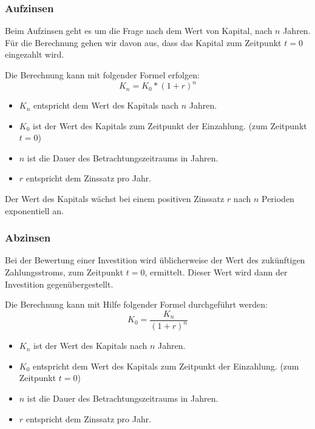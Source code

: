 \documentclass[a4paper,12pt]{article}
\begin{document}
	\subsubsection{Aufzinsen}
	Beim Aufzinsen geht es um die Frage nach dem Wert von Kapital, nach $n$ Jahren. Für die Berechnung gehen wir davon aus, dass das Kapital zum Zeitpunkt $t=0$ eingezahlt wird.\\ \par
	\noindent Die Berechnung kann mit folgender Formel erfolgen:
	\begin{equation}
	K_n=K_0*(1+r)^n
	\end{equation}
	\begin{itemize}
		\item $K_n$ entspricht dem Wert des Kapitals nach $n$ Jahren.
		\item $K_0$ ist der Wert des Kapitals zum Zeitpunkt der Einzahlung. (zum Zeitpunkt $t=0$)
		\item $n$ ist die Dauer des Betrachtungszeitraums in Jahren.
		\item $r$ entspricht dem Zinssatz pro Jahr.
	\end{itemize}
	Der Wert des Kapitals wächst bei einem positiven Zinssatz $r$ nach $n$ Perioden exponentiell an.
	\subsubsection{Abzinsen}
	Bei der Bewertung einer Investition wird üblicherweise der Wert des zukünftigen Zahlungsstroms, zum Zeitpunkt $t=0$, ermittelt. Dieser Wert wird dann der Investition gegenübergestellt.\\ \par
	Die Berechnung kann mit Hilfe folgender Formel durchgeführt werden:
	\begin{equation}
	K_0=\frac{K_n}{(1+r)^n}
	\end{equation}
	\begin{itemize}
		\item $K_n$ ist der Wert des Kapitals nach $n$ Jahren.
		\item $K_0$ entspricht dem Wert des Kapitals zum Zeitpunkt der Einzahlung. (zum Zeitpunkt $t=0$)
		\item $n$ ist die Dauer des Betrachtungszeitraums in Jahren.
		\item $r$ entspricht dem Zinssatz pro Jahr.
	\end{itemize}
\end{document}
